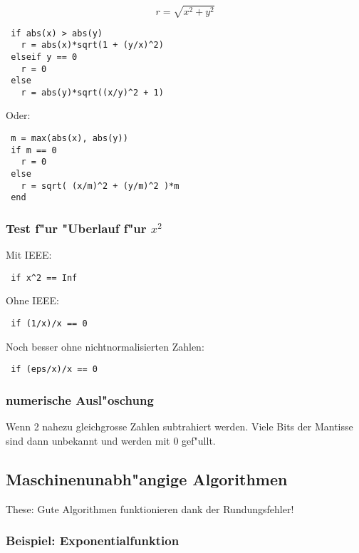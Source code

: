 \documentclass[german, 10pt, a4paper, twocolumn]{scrartcl}
\theoremstyle{definition}
\begin{document}
\begin{displaymath}
	r = \sqrt{x^2+y^2}
\end{displaymath}

\small
\begin{verbatim}
 if abs(x) > abs(y)
   r = abs(x)*sqrt(1 + (y/x)^2)
 elseif y == 0
   r = 0
 else
   r = abs(y)*sqrt((x/y)^2 + 1)
\end{verbatim}
\normalsize

Oder:
\small
\begin{verbatim}
 m = max(abs(x), abs(y))
 if m == 0
   r = 0
 else
   r = sqrt( (x/m)^2 + (y/m)^2 )*m
 end
\end{verbatim}
\normalsize

\subsubsection{Test f"ur "Uberlauf f"ur $x^2$}

Mit IEEE:
\small
\begin{verbatim}
 if x^2 == Inf
\end{verbatim}
\normalsize

Ohne IEEE:
\small
\begin{verbatim}
 if (1/x)/x == 0
\end{verbatim}
\normalsize

Noch besser ohne nichtnormalisierten Zahlen:
\small
\begin{verbatim}
 if (eps/x)/x == 0
\end{verbatim}
\normalsize

\subsubsection{numerische Ausl"oschung}

Wenn 2 nahezu gleichgrosse Zahlen subtrahiert werden. Viele Bits der Mantisse sind dann unbekannt und werden mit 0 gef"ullt.

\subsection{Maschinenunabh"angige Algorithmen}

These: Gute Algorithmen funktionieren dank der Rundungsfehler!

\subsubsection{Beispiel: Exponentialfunktion}
\end{document}
